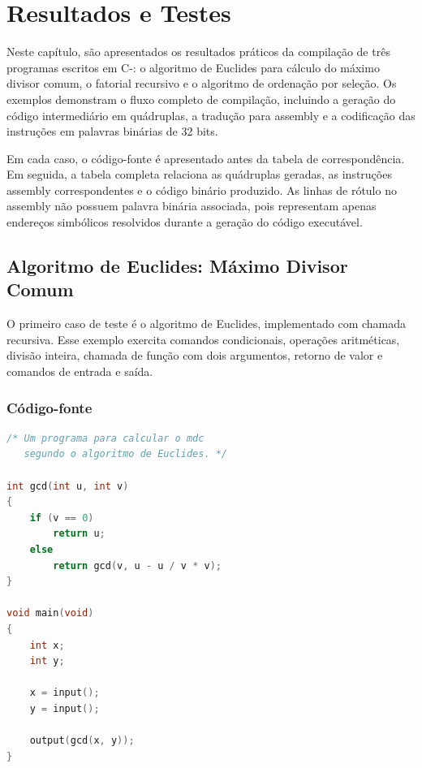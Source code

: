 \chapter{Resultados e Testes}
\label{chap:resultados}

Neste capítulo, são apresentados os resultados práticos da compilação de três programas escritos em C-: o algoritmo de Euclides para cálculo do máximo divisor comum, o fatorial recursivo e o algoritmo de ordenação por seleção. Os exemplos demonstram o fluxo completo de compilação, incluindo a geração do código intermediário em quádruplas, a tradução para assembly e a codificação das instruções em palavras binárias de 32 bits.

Em cada caso, o código-fonte é apresentado antes da tabela de correspondência. Em seguida, a tabela completa relaciona as quádruplas geradas, as instruções assembly correspondentes e o código binário produzido. As linhas de rótulo no assembly não possuem palavra binária associada, pois representam apenas endereços simbólicos resolvidos durante a geração do código executável.

\section{Algoritmo de Euclides: Máximo Divisor Comum}
\label{sec:res_gcd}

O primeiro caso de teste é o algoritmo de Euclides, implementado com chamada recursiva. Esse exemplo exercita comandos condicionais, operações aritméticas, divisão inteira, chamada de função com dois argumentos, retorno de valor e comandos de entrada e saída.

\subsection{Código-fonte}

\begin{lstlisting}[language=C, caption={Código-fonte do algoritmo de Euclides para cálculo do MDC.}, label={lst:gcd_fonte}]
/* Um programa para calcular o mdc
   segundo o algoritmo de Euclides. */

int gcd(int u, int v)
{
    if (v == 0)
        return u;
    else
        return gcd(v, u - u / v * v);
}

void main(void)
{
    int x;
    int y;

    x = input();
    y = input();

    output(gcd(x, y));
}
\end{lstlisting}

